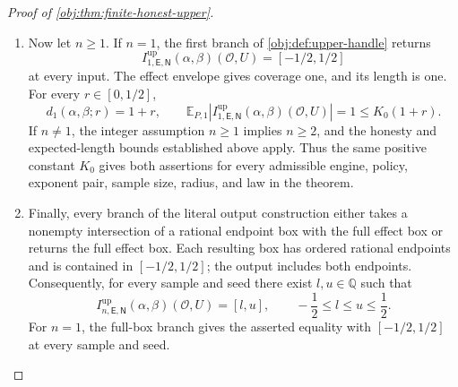 \begin{proof}[Proof of \cref{obj:thm:finite-honest-upper}]
\begin{enumerate}
\item Now let \(n\ge1\). If \(n=1\), the first branch of
\cref{obj:def:upper-handle} returns
\[
I^{\mathrm{up}}_{1,\mathsf E,\mathsf N}(\alpha,\beta)(\mathcal O,U)
=[-1/2,1/2]
\]
at every input. The effect envelope gives coverage one, and its length is one. For every \(r\in[0,1/2]\),
\[
d_1(\alpha,\beta;r)=1+r,
\qquad
\mathbb E_{P,1}
\left|
I^{\mathrm{up}}_{1,\mathsf E,\mathsf N}(\alpha,\beta)(\mathcal O,U)
\right|
=1
\le K_0(1+r).
\]
If \(n\ne1\), the integer assumption \(n\ge1\) implies \(n\ge2\), and the honesty and expected-length bounds established above apply. Thus the same positive constant \(K_0\) gives both assertions for every admissible engine, policy, exponent pair, sample size, radius, and law in the theorem.

\item Finally, every branch of the literal output construction either takes a nonempty intersection of a rational endpoint box with the full effect box or returns the full effect box. Each resulting box has ordered rational endpoints and is contained in \([-1/2,1/2]\); the output includes both endpoints. Consequently, for every sample and seed there exist \(l,u\in\mathbb Q\) such that
\[
I^{\mathrm{up}}_{n,\mathsf E,\mathsf N}(\alpha,\beta)(\mathcal O,U)
=[l,u],
\qquad
-\frac12\le l\le u\le\frac12.
\]
For \(n=1\), the full-box branch gives the asserted equality with
\([-1/2,1/2]\) at every sample and seed.
\end{enumerate}
\end{proof}

